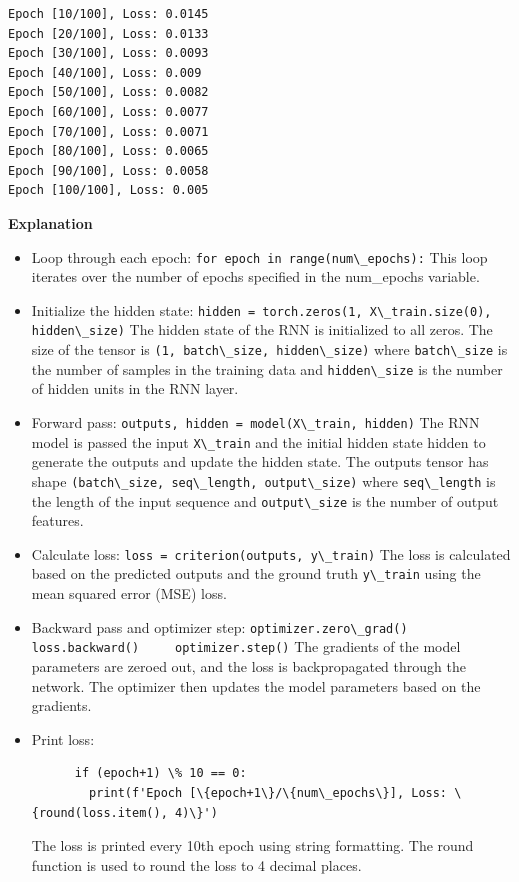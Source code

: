 \begin{lstlisting}
Epoch [10/100], Loss: 0.0145
Epoch [20/100], Loss: 0.0133
Epoch [30/100], Loss: 0.0093
Epoch [40/100], Loss: 0.009
Epoch [50/100], Loss: 0.0082
Epoch [60/100], Loss: 0.0077
Epoch [70/100], Loss: 0.0071
Epoch [80/100], Loss: 0.0065
Epoch [90/100], Loss: 0.0058
Epoch [100/100], Loss: 0.005
\end{lstlisting}

\textbf{Explanation}

\begin{itemize}
\item Loop through each epoch:
  \lstinline{for epoch in range(num\_epochs):} This loop
  iterates over the number of epochs specified in the num\_epochs
  variable.
\item Initialize the hidden state:
  \lstinline{hidden = torch.zeros(1, X\_train.size(0), hidden\_size)}
  The hidden state of the RNN is initialized to all zeros. The size of
  the tensor is \lstinline{(1, batch\_size, hidden\_size)}
  where \lstinline{batch\_size} is the number of samples
  in the training data and \lstinline{hidden\_size} is the
  number of hidden units in the RNN layer.
\item Forward pass:
  \lstinline{outputs, hidden = model(X\_train, hidden)}
  The RNN model is passed the input \lstinline{X\_train}
  and the initial hidden state hidden to generate the outputs and update
  the hidden state. The outputs tensor has shape
  \lstinline{(batch\_size, seq\_length, output\_size)}
  where \lstinline{seq\_length} is the length of the input
  sequence and \lstinline{output\_size} is the number of
  output features.
\item Calculate loss:
  \lstinline{loss = criterion(outputs, y\_train)} The loss
  is calculated based on the predicted outputs and the ground truth
  \lstinline{y\_train} using the mean squared error (MSE)
  loss.
\item Backward pass and optimizer step:
  \lstinline{optimizer.zero\_grad()     loss.backward()     optimizer.step()}
  The gradients of the model parameters are zeroed out, and the loss is
  backpropagated through the network. The optimizer then updates the
  model parameters based on the gradients.
\item Print loss:
  \begin{lstlisting}
      if (epoch+1) \% 10 == 0:
        print(f'Epoch [\{epoch+1\}/\{num\_epochs\}], Loss: \{round(loss.item(), 4)\}')
  \end{lstlisting}
  The loss is printed every 10th epoch using string formatting. The
  round function is used to round the loss to 4 decimal places.
\end{itemize}

